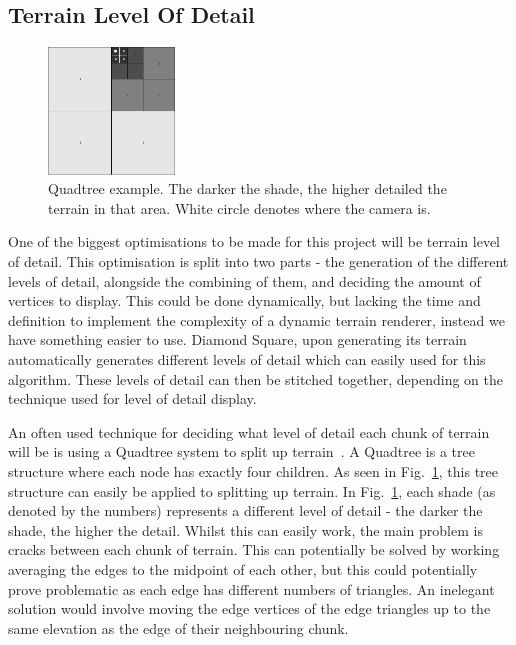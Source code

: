 \documentclass[a4paper,10pt]{report}
\begin{document}
\subsection{Terrain Level Of Detail}

\begin{figure}[h!]
    \centering
  \includegraphics[width=0.3\textwidth]{Images/Charts/QuadTree.png}
 \caption{Quadtree example. The darker the shade, the higher detailed the terrain in that area. White circle denotes where the camera is.}
 \label{fig:quad_tree}
\end{figure}

One of the biggest optimisations to be made for this project will be terrain level of detail. This optimisation is split into two parts - the generation of the different levels of detail, alongside the combining of them, and deciding the amount of vertices to display. This could be done dynamically, but lacking the time and definition  to implement the complexity of a dynamic terrain renderer, instead we have something easier to use. Diamond Square, upon generating its terrain automatically generates different levels of detail which can easily used for this algorithm. These levels of detail can then be stitched together, depending on the technique used for level of detail display. \medskip

An often used technique for deciding what level of detail each chunk of terrain will be is using a Quadtree system to split up terrain~\cite{pajarola1998large}. A Quadtree is a tree structure where each node has exactly four children. As seen in Fig.~\ref{fig:quad_tree}, this tree structure can easily be applied to splitting up terrain. In Fig.~\ref{fig:quad_tree}, each shade (as denoted by the numbers) represents a different level of detail - the darker the shade, the higher the detail. Whilst this can easily work, the main problem is cracks between each chunk of terrain. This can potentially be solved by working averaging the edges to the midpoint of each other, but this could potentially prove problematic as each edge has different numbers of triangles. An inelegant solution would involve moving the edge vertices of the edge triangles up to the same elevation as the edge of their neighbouring chunk. \medskip
\end{document}
